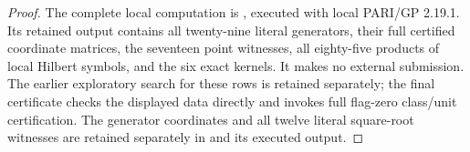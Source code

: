\begin{proof}
The complete local computation is
,
executed with local PARI/GP 2.19.1.  Its retained output
contains all twenty-nine literal generators, their
full certified coordinate matrices, the seventeen
point witnesses, all eighty-five products of local
Hilbert symbols, and the six exact kernels.  It makes
no external submission.  The earlier exploratory
search for these rows is retained separately; the
final certificate checks the displayed data directly
and invokes full flag-zero class/unit certification.
The generator coordinates and all twelve literal
square-root witnesses are retained separately in
and its executed output.
\end{proof}
